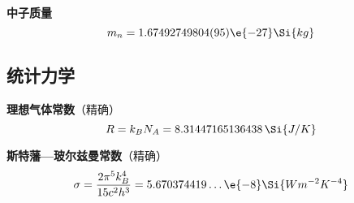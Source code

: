 \textbf{中子质量}
\begin{equation}
m_n = 1.67492749804(95)\e{-27}\Si{kg}
\end{equation}

\subsection{统计力学}

\textbf{理想气体常数}（精确）
\begin{equation}
R = k_B N_A = 8.31447165136438 \,\Si{J/K}
\end{equation}

\textbf{斯特藩—玻尔兹曼常数}（精确）
\begin{equation}
\sigma = \frac{2\pi^5k_B^4}{15c^2h^3} = 5.670374419\dots\e{-8} \Si{Wm^{-2}K^{-4}}
\end{equation}
